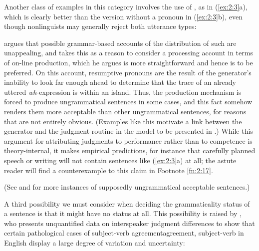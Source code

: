\noindent
Another class of examples in this category involves the use of , as in (\ref{ex:2:3}a), which is clearly better than the version without a pronoun in (\ref{ex:2:3}b), even though nonlinguists may generally reject both utterance types:


\ea\label{ex:2:3}
\z
\z


\noindent
\citet{Kroch1981} argues that possible grammar-based accounts of the distribution of such  are unappealing, and takes this as a reason to consider a processing account in terms of on-line production, which he argues is more straightforward and hence is to be preferred. On this account, resumptive pronouns are the result of the generator's inability to look far enough ahead to determine that the trace of an already uttered \textit{wh}-expression is within an island. Thus, the production mechanism is forced to produce ungrammatical sentences in some cases, and this fact somehow renders them more acceptable than other ungrammatical sentences, for reasons that are not entirely obvious. (Examples like this motivate a link between the generator and the judgment routine in the model to be presented in .) While this argument for attributing judgments to performance rather than to competence is theory-internal, it makes empirical predictions, for instance that carefully planned speech or writing will not contain sentences like (\ref{ex:2:3}a) at all; the astute reader will find a counterexample to this claim in Footnote \ref{fn:2:17}.

(See \citealt{LangendoenEtAl1973} and \citealt{Bever1974} for more instances of supposedly ungrammatical  acceptable sentences.)

A third possibility we must consider when deciding the grammaticality status of a sentence is that it might have no status at all. This possibility is raised by \citet{Morgan1972}, who presents unquantified data on interspeaker judgment differences to show that certain pathological cases of subject-verb agreement{agreement, subject-verb} in English display a large degree of variation and uncertainty:

\ea\label{ex:2:4}
\z
\z

